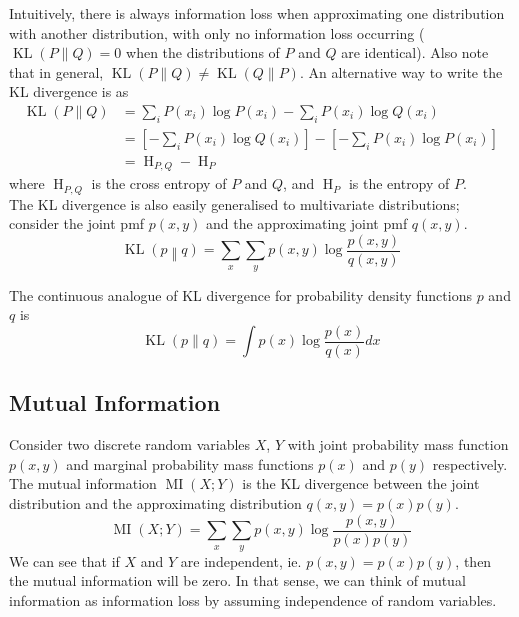 \documentclass[11pt]{report} %
\begin{document}
Intuitively, there is always information loss when approximating one distribution with another distribution, with only no information loss occurring ($\operatorname{KL}\left(P\|Q\right) = 0$ when the distributions of $P$ and $Q$ are identical). Also note that in general, $\operatorname{KL}\left(P\|Q\right) \neq \operatorname{KL}\left(Q\|P\right)$. An alternative way to write the KL divergence is as
\begin{align}
\operatorname{KL}\left(P\|Q\right) &= \sum_{i}P\left(x_{i}\right)\log P\left(x_{i}\right) - \sum_{i}P\left(x_{i}\right)\log Q\left(x_{i}\right) \\
&= \left[- \sum_{i}P\left(x_{i}\right)\log Q\left(x_{i}\right)\right] - \left[-\sum_{i}P\left(x_{i}\right)\log P\left(x_{i}\right)\right] \\
&= \operatorname{H}_{P, Q} - \operatorname{H}_{P}
\end{align}
where $\operatorname{H}_{P, Q}$ is the cross entropy of $P$ and $Q$, and $\operatorname{H}_{P}$ is the entropy of $P$. \\

The KL divergence is also easily generalised to multivariate distributions; consider the joint pmf $p\left(x, y\right)$ and the approximating joint pmf $q\left(x, y\right)$.
\begin{equation}
\operatorname{KL}\left(p\middle\Vert q\right) = \sum_{x}\sum_{y}p\left(x, y\right)\log\dfrac{p\left(x, y\right)}{q\left(x, y\right)}
\end{equation}

The continuous analogue of KL divergence for probability density functions $p$ and $q$ is
\begin{equation}
\operatorname{KL}\left(p\|q\right) = \int p\left(x\right)\log\dfrac{p\left(x\right)}{q\left(x\right)}dx
\end{equation}

\subsection{Mutual Information}

Consider two discrete random variables $X$, $Y$ with joint probability mass function $p\left(x, y\right)$ and marginal probability mass functions $p\left(x\right)$ and $p\left(y\right)$ respectively. The mutual information $\operatorname{MI}\left(X;Y\right)$ is the KL divergence between the joint distribution and the approximating distribution $q\left(x, y\right) = p\left(x\right)p\left(y\right)$.
\begin{equation}
\operatorname{MI}\left(X;Y\right) = \sum_{x}\sum_{y}p\left(x, y\right)\log\dfrac{p\left(x, y\right)}{p\left(x\right)p\left(y\right)}
\end{equation}
We can see that if $X$ and $Y$ are independent, ie. $p\left(x, y\right) = p\left(x\right)p\left(y\right)$, then the mutual information will be zero. In that sense, we can think of mutual information as information loss by assuming independence of random variables.
\end{document}

